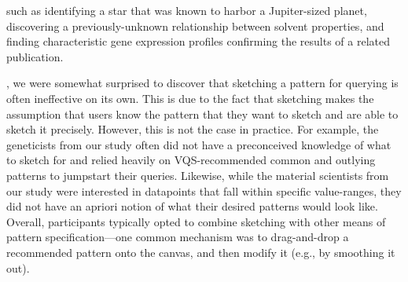  such as identifying a star that was known to harbor a Jupiter-sized planet, discovering a previously-unknown relationship between solvent properties, and finding characteristic gene expression profiles confirming the results of a related publication. %
 \par {}, we were somewhat surprised to discover that sketching a pattern for querying is often ineffective on its own. This is due to the fact that sketching makes the assumption that users know the pattern that they want to sketch and are able to sketch it precisely. However, this is  not the case in practice. For example, the geneticists from our study often did not have a preconceived knowledge of what to sketch for and relied heavily on VQS-recommended common and outlying patterns to jumpstart their queries. Likewise, while the material scientists from our study were interested in datapoints that fall within specific value-ranges, they did not have an apriori notion of what their desired patterns would look like. Overall, participants typically opted to combine sketching with other means of pattern specification---one common mechanism was to drag-and-drop a recommended pattern onto the canvas, and then modify it (e.g., by smoothing it out). %
